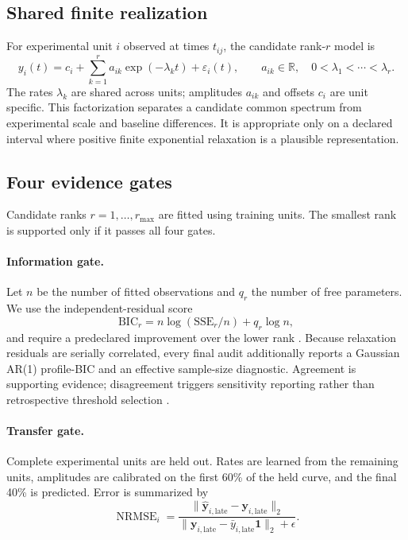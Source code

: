\documentclass[11pt]{article}
\newcommand{\nrmse}{\operatorname{NRMSE}}
\begin{document}
\subsection{Shared finite realization}
For experimental unit $i$ observed at times $t_{ij}$, the candidate rank-$r$ model is
\begin{equation}
y_i(t)=c_i+\sum_{k=1}^{r}a_{ik}\exp(-\lambda_k t)+\varepsilon_i(t),
\qquad a_{ik}\in\mathbb R,\quad 0<\lambda_1<\cdots<\lambda_r.
\label{eq:model}
\end{equation}
The rates $\lambda_k$ are shared across units; amplitudes $a_{ik}$ and offsets $c_i$ are unit specific. This factorization separates a candidate common spectrum from experimental scale and baseline differences. It is appropriate only on a declared interval where positive finite exponential relaxation is a plausible representation.

\subsection{Four evidence gates}
Candidate ranks $r=1,\ldots,r_{\max}$ are fitted using training units. The smallest rank is supported only if it passes all four gates.

\paragraph{Information gate.} Let $n$ be the number of fitted observations and $q_r$ the number of free parameters. We use the independent-residual score
\begin{equation}
\mathrm{BIC}_r=n\log(\mathrm{SSE}_r/n)+q_r\log n,
\end{equation}
and require a predeclared improvement over the lower rank \cite{schwarz1978bic}. Because relaxation residuals are serially correlated, every final audit additionally reports a Gaussian AR(1) profile-BIC and an effective sample-size diagnostic. Agreement is supporting evidence; disagreement triggers sensitivity reporting rather than retrospective threshold selection \cite{hurvich1989timeseries}.


\paragraph{Transfer gate.} Complete experimental units are held out. Rates are learned from the remaining units, amplitudes are calibrated on the first 60\% of the held curve, and the final 40\% is predicted. Error is summarized by
\begin{equation}
\nrmse_i=\frac{\|\hat{\mathbf y}_{i,\mathrm{late}}-\mathbf y_{i,\mathrm{late}}\|_2}
{\|\mathbf y_{i,\mathrm{late}}-\bar y_{i,\mathrm{late}}\mathbf 1\|_2+\epsilon}.
\end{equation}
\end{document}
